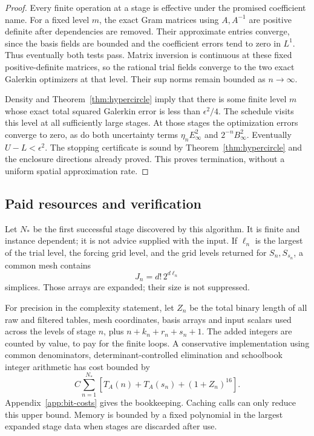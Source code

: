 \documentclass[11pt,a4paper]{article}
\numberwithin{equation}{section}
\theoremstyle{definition}
\theoremstyle{remark}\newtheorem{remark}[theorem]{Remark}
\begin{document}
\begin{proof}
Every finite operation at a stage is effective under the promised
coefficient name. For a fixed level \(m\), the exact Gram matrices
using \(A,A^{-1}\) are positive definite after dependencies are
removed. Their approximate entries converge, since the basis fields
are bounded and the coefficient errors tend to zero in \(L^1\).
Thus eventually both tests pass. Matrix inversion is continuous at
these fixed positive-definite matrices, so the rational trial fields
converge to the two exact Galerkin optimizers at that level. Their
sup norms remain bounded as \(n\to\infty\).

Density and Theorem~\ref{thm:hypercircle} imply that there is some
finite level \(m\) whose exact total squared Galerkin error is less
than \(\epsilon^2/4\). The schedule visits this level at all
sufficiently large stages. At those stages the optimization errors
converge to zero, as do both uncertainty terms
\(\eta_nE_\infty^2\) and \(2^{-n}B_\infty^2\).
Eventually \(U-L<\epsilon^2\). The stopping certificate is sound by
Theorem~\ref{thm:hypercircle} and the enclosure directions already
proved. This proves termination, without a uniform spatial
approximation rate.
\end{proof}

\subsection{Paid resources and verification}

Let \(N_*\) be the first successful stage discovered by this algorithm.
It is finite and instance dependent; it is not advice supplied with
the input. If \(\ell_n\) is the largest of the trial level, the forcing
grid level, and the grid levels returned for \(S_n,S_{s_n}\), a
common mesh contains
\[
 J_n=d!\,2^{d\ell_n}
\]
simplices. Those arrays are expanded; their size is not suppressed.

For precision in the complexity statement, let \(Z_n\) be the total
binary length of all raw and filtered tables, mesh coordinates,
basis arrays and input scalars used across the levels of stage \(n\),
plus \(n+k_n+r_n+s_n+1\). The added integers are counted by value,
to pay for the finite loops. A conservative implementation using
common denominators, determinant-controlled elimination and
schoolbook integer arithmetic has cost bounded by
\begin{equation}\label{eq:algorithm-cost}
 C\sum_{n=1}^{N_*}
       [T_A(n)+T_A(s_n)+(1+Z_n)^{16}].
\end{equation}
Appendix~\ref{app:bit-costs} gives the bookkeeping. Caching calls
can only reduce this upper bound.
Memory is bounded by a fixed polynomial in the largest expanded
stage data when stages are discarded after use.
\end{document}
